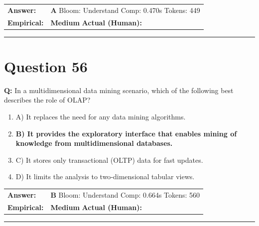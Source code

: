 \documentclass[9pt]{article}
\begin{document}
\begin{tabular}{@{}l p{10.5cm}@{}}
\textbf{Answer:} & \textbf{A} \hspace{1em} Bloom: Understand \hspace{1em} Comp: 0.470s \hspace{1em} Tokens: 449 \\
\textbf{Empirical:} & \textbf{Medium} \hspace{1em} \textbf{Actual (Human):} \underline{\hspace{5cm}}
\end{tabular}

\vspace{0.2cm}
\rule{\textwidth}{0.4pt}
\vspace{0.2cm}


\section*{Question 56}

\textbf{Q:} In a multidimensional data mining scenario, which of the following best describes the role of OLAP?

\begin{enumerate}[label=\textbf{\alph{*})}, nosep]
    \item A) It replaces the need for any data mining algorithms.
    \item \textbf{B) It provides the exploratory interface that enables mining of knowledge from multidimensional databases.} %
    \item C) It stores only transactional (OLTP) data for fast updates.
    \item D) It limits the analysis to two‑dimensional tabular views.

\end{enumerate}

\begin{tabular}{@{}l p{10.5cm}@{}}
\textbf{Answer:} & \textbf{B} \hspace{1em} Bloom: Understand \hspace{1em} Comp: 0.664s \hspace{1em} Tokens: 560 \\
\textbf{Empirical:} & \textbf{Medium} \hspace{1em} \textbf{Actual (Human):} \underline{\hspace{5cm}}
\end{tabular}

\vspace{0.2cm}
\rule{\textwidth}{0.4pt}
\vspace{0.2cm}
\end{document}
